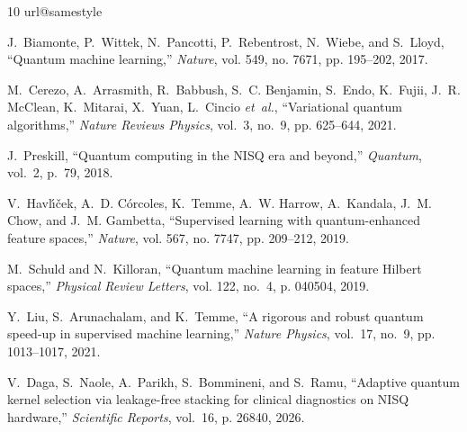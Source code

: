 \documentclass[journal,twocolumn]{IEEEtran}
\begin{document}
\begin{thebibliography}{10}
\providecommand{\url}[1]{#1}
\csname url@samestyle\endcsname
\providecommand{\newblock}{\relax}
\providecommand{\bibinfo}[2]{#2}
\providecommand{\BIBentrySTDinterwordspacing}{\spaceskip=0pt\relax}
\providecommand{\BIBentryALTinterwordstretchfactor}{4}
\providecommand{\BIBentryALTinterwordspacing}{\spaceskip=\fontdimen2\font plus
\BIBentryALTinterwordstretchfactor\fontdimen3\font minus
  \fontdimen4\font\relax}
\providecommand{\BIBforeignlanguage}[2]{{%
\expandafter\ifx\csname l@#1\endcsname\relax
\typeout{** WARNING: IEEEtran.bst: No hyphenation pattern has been}%
\typeout{** loaded for the language `#1'. Using the pattern for}%
\typeout{** the default language instead.}%
\else
\language=\csname l@#1\endcsname
\fi
#2}}
\providecommand{\BIBdecl}{\relax}
\BIBdecl

J.~Biamonte, P.~Wittek, N.~Pancotti, P.~Rebentrost, N.~Wiebe, and S.~Lloyd,
  ``Quantum machine learning,'' \emph{Nature}, vol. 549, no. 7671, pp.
  195--202, 2017.

M.~Cerezo, A.~Arrasmith, R.~Babbush, S.~C. Benjamin, S.~Endo, K.~Fujii,
  J.~R. McClean, K.~Mitarai, X.~Yuan, L.~Cincio \emph{et~al.}, ``Variational
  quantum algorithms,'' \emph{Nature Reviews Physics}, vol.~3, no.~9, pp.
  625--644, 2021.

J.~Preskill, ``Quantum computing in the {NISQ} era and beyond,'' \emph{Quantum},
  vol.~2, p.~79, 2018.

V.~Havl{\'\i}{\v{c}}ek, A.~D. C{\'o}rcoles, K.~Temme, A.~W. Harrow, A.~Kandala,
  J.~M. Chow, and J.~M. Gambetta, ``Supervised learning with quantum-enhanced
  feature spaces,'' \emph{Nature}, vol. 567, no. 7747, pp. 209--212, 2019.

M.~Schuld and N.~Killoran, ``Quantum machine learning in feature {Hilbert}
  spaces,'' \emph{Physical Review Letters}, vol. 122, no.~4, p. 040504, 2019.

Y.~Liu, S.~Arunachalam, and K.~Temme, ``A rigorous and robust quantum speed-up
  in supervised machine learning,'' \emph{Nature Physics}, vol.~17, no.~9, pp.
  1013--1017, 2021.

V.~Daga, S.~Naole, A.~Parikh, S.~Bommineni, and S.~Ramu, ``Adaptive quantum
  kernel selection via leakage-free stacking for clinical diagnostics on {NISQ}
  hardware,'' \emph{Scientific Reports}, vol.~16, p. 26840, 2026.


\end{thebibliography}
\end{document}
